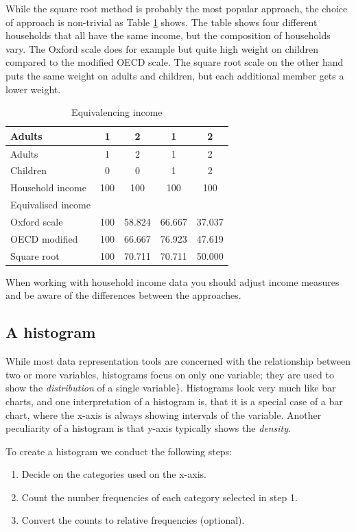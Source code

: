 \documentclass[]{book}
\providecommand{\tightlist}{%
  \setlength{\itemsep}{0pt}\setlength{\parskip}{0pt}}
\begin{document}
While the square root method is probably the most popular approach, the choice of approach is non-trivial as Table \ref{tab:povt0} shows. The table shows four different households that all have the same income, but the composition of households vary. The Oxford scale does for example but quite high weight on children compared to the modified OECD scale. The square root scale on the other hand puts the same weight on adults and children, but each additional member gets a lower weight.

\begin{longtable}[]{@{}lcccc@{}}
\caption{\label{tab:povt0} Equivalencing income}\tabularnewline
\toprule
Adults & 1 & 2 & 1 & 2\tabularnewline
\midrule
\endfirsthead
\toprule
Adults & 1 & 2 & 1 & 2\tabularnewline
\midrule
\endhead
Children & 0 & 0 & 1 & 2\tabularnewline
Household income & 100 & 100 & 100 & 100\tabularnewline
Equivalised income & & & &\tabularnewline
Oxford scale & 100 & 58.824 & 66.667 & 37.037\tabularnewline
OECD modified & 100 & 66.667 & 76.923 & 47.619\tabularnewline
Square root & 100 & 70.711 & 70.711 & 50.000\tabularnewline
\bottomrule
\end{longtable}

When working with household income data you should adjust income measures and be aware of the differences between the approaches.

\hypertarget{a-histogram}{%
\subsection*{A histogram}\label{a-histogram}}

While most data representation tools are concerned with the relationship between two or more variables, histograms focus on only one variable; they are used to show the \emph{distribution} of a single variable\}. Histograms look very much like bar charts, and one interpretation of a histogram is, that it is a special case of a bar chart, where the x-axis is always showing intervals of the variable. Another peculiarity of a histogram is that y-axis typically shows the \emph{density}.

To create a histogram we conduct the following steps:

\begin{enumerate}
\def\labelenumi{\arabic{enumi}.}
\tightlist
\item
  Decide on the categories used on the x-axis.
\item
  Count the number frequencies of each category selected in step 1.
\item
  Convert the counts to relative frequencies (optional).
\end{enumerate}
\end{document}

